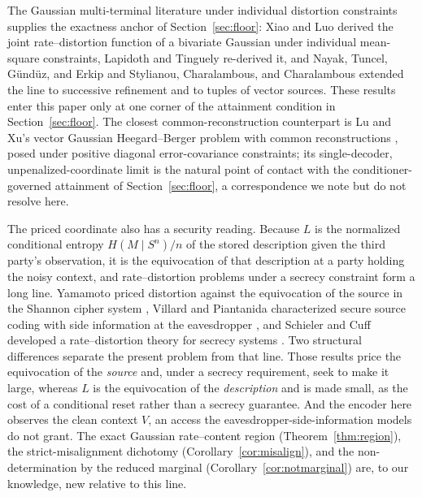 ﻿\documentclass[11pt,onecolumn]{IEEEtran}
\begin{document}
The Gaussian multi-terminal literature under individual distortion
constraints supplies the exactness anchor of
Section~\ref{sec:floor}: Xiao and Luo \cite{xiaoluo2005} derived the
joint rate--distortion function of a bivariate Gaussian under
individual mean-square constraints, Lapidoth and Tinguely
\cite{lapidothtinguely2010} re-derived it, and Nayak, Tuncel,
G\"und\"uz, and Erkip \cite{nayak2010} and Stylianou, Charalambous,
and Charalambous \cite{stylianou2021} extended the line to successive
refinement and to tuples of vector sources. These results enter this
paper only at one corner of the attainment condition in
Section~\ref{sec:floor}. The closest common-reconstruction counterpart is
Lu and Xu's vector Gaussian Heegard--Berger problem with common
reconstructions \cite{luxu2021}, posed under positive diagonal
error-covariance constraints; its single-decoder, unpenalized-coordinate
limit is the natural point of contact with the conditioner-governed
attainment of Section~\ref{sec:floor}, a correspondence we note but do not
resolve here.

The priced coordinate also has a security reading. Because $L$ is the
normalized conditional entropy $H(M\mid S^n)/n$ of the stored description given
the third party's observation, it is the equivocation of that description at a
party holding the noisy context, and rate--distortion problems under a secrecy
constraint form a long line. Yamamoto priced distortion against the equivocation
of the source in the Shannon cipher system \cite{yamamoto1997}, Villard and
Piantanida characterized secure source coding with side information at the
eavesdropper \cite{villard2013}, and Schieler and Cuff developed a
rate--distortion theory for secrecy systems \cite{schieler2014}. Two structural
differences separate the present problem from that line. Those results price the
equivocation of the \emph{source} and, under a secrecy requirement, seek to make
it large, whereas $L$ is the equivocation of the \emph{description} and is made
small, as the cost of a conditional reset rather than a secrecy guarantee. And
the encoder here observes the clean context $V$, an access the
eavesdropper-side-information models do not grant. The exact Gaussian
rate--content region (Theorem~\ref{thm:region}), the strict-misalignment
dichotomy (Corollary~\ref{cor:misalign}), and the non-determination by the
reduced marginal (Corollary~\ref{cor:notmarginal}) are, to our knowledge, new
relative to this line.
\end{document}
